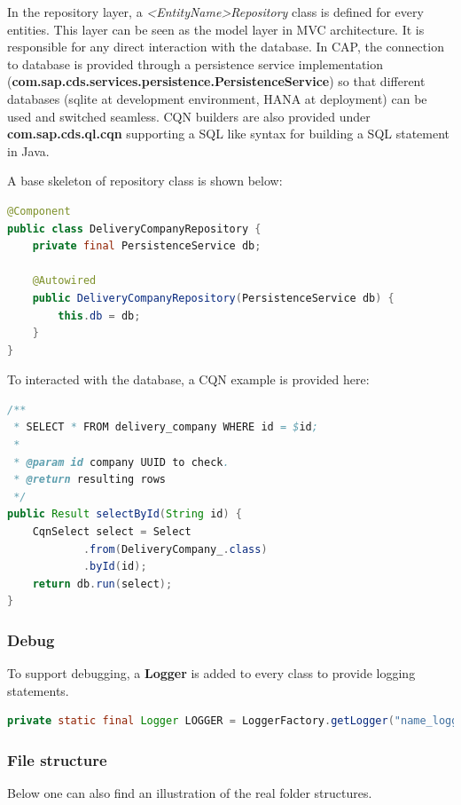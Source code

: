 \bigskip
In the repository layer, a \textit{<EntityName>Repository} class is defined for every entities. This layer can be seen as the model layer in MVC architecture. It is responsible for any direct interaction with the database. In CAP, the connection to database is provided through a persistence service implementation (\textbf{com.sap.cds.services.persistence.PersistenceService}) so that different databases (sqlite at development environment, HANA at deployment) can be used and switched seamless. CQN builders are also provided under \textbf{com.sap.cds.ql.cqn} supporting a SQL like syntax for building a SQL statement in Java.

 A base skeleton of repository class is shown below:

\begin{lstlisting}[language={java}]
@Component
public class DeliveryCompanyRepository {
    private final PersistenceService db;

    @Autowired
    public DeliveryCompanyRepository(PersistenceService db) {
        this.db = db;
    }
}
\end{lstlisting}

To interacted with the database, a CQN example is provided here:

\begin{lstlisting}[language={java}]
/**
 * SELECT * FROM delivery_company WHERE id = $id;
 *
 * @param id company UUID to check.
 * @return resulting rows
 */
public Result selectById(String id) {
    CqnSelect select = Select
            .from(DeliveryCompany_.class)
            .byId(id);
    return db.run(select);
}
\end{lstlisting}

\subsubsection{Debug}

To support debugging, a \textbf{Logger} is added to every class to provide logging statements.

\begin{lstlisting}[language={java}]
 private static final Logger LOGGER = LoggerFactory.getLogger("name_logger");
\end{lstlisting}


\subsubsection{File structure}
Below one can also find an illustration of the real folder structures.

